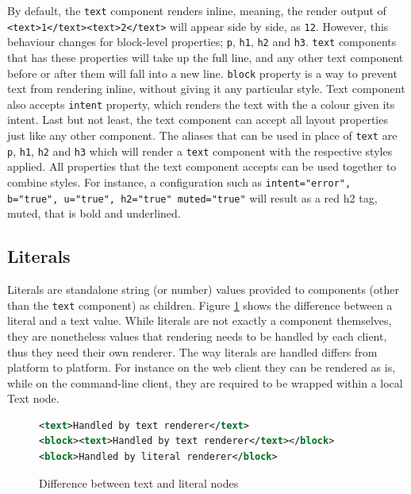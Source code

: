 By default, the \texttt{text} component renders inline, meaning, the render output of \texttt{<text>1</text><text>2</text>} will appear side by side, as \texttt{12}. However, this behaviour changes for block-level properties; \texttt{p}, \texttt{h1}, \texttt{h2} and \texttt{h3}. \texttt{text} components that has these properties will take up the full line, and any other text component before or after them will fall into a new line. \texttt{block} property is a way to prevent text from rendering inline, without giving it any particular style. Text component also accepts \texttt{intent} property, which renders the text with the a colour given its intent. Last but not least, the text component can accept all layout properties just like any other component. The aliases that can be used in place of \texttt{text} are \texttt{p}, \texttt{h1}, \texttt{h2} and \texttt{h3} which will render a \texttt{text} component with the respective styles applied. All properties that the text component accepts can be used together to combine styles. For instance, a configuration such as \texttt{intent="error", b="true", u="true", h2="true" muted="true"} will result as a red h2 tag, muted, that is bold and underlined.

\subsection{Literals}

Literals are standalone string (or number) values provided to components (other than the \texttt{text} component) as children. Figure \ref{fig:text_vs_literal} shows the difference between a literal and a text value. While literals are not exactly a component themselves, they are nonetheless values that rendering needs to be handled by each client, thus they need their own renderer. The way literals are handled differs from platform to platform. For instance on the web client they can be rendered as is, while on the command-line client, they are required to be wrapped within a local Text node.

\begin{figure}
\begin{minipage}{\linewidth}
\begin{lstlisting}[language=xml]
<text>Handled by text renderer</text>
<block><text>Handled by text renderer</text></block>
<block>Handled by literal renderer</block>
\end{lstlisting}
\end{minipage}
\caption{Difference between text and literal nodes}%
\label{fig:text_vs_literal}%
\end{figure}


